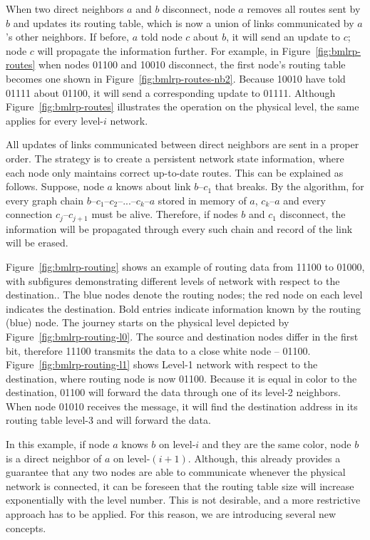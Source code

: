 \documentclass[14pt]{extarticle}
\theoremstyle{definition}
\begin{document}


When two direct neighbors $a$ and $b$ disconnect, node $a$ removes all routes sent by $b$ and updates its routing table, which is now a union of links communicated by $a$'s other neighbors. If before, $a$ told node $c$ about $b$, it will send an update to $c$; node $c$ will propagate the information further. For example, in Figure~\ref{fig:bmlrp-routes} when nodes 01100 and 10010 disconnect, the first node's routing table becomes one shown in Figure~\ref{fig:bmlrp-routes-nb2}. Because 10010 have told 01111 about 01100, it will send a corresponding update to 01111. Although Figure~\ref{fig:bmlrp-routes} illustrates the operation on the physical level, the same applies for every level-$i$ network.

All updates of links communicated between direct neighbors are sent in a proper order. The strategy is to create a persistent network state information, where each node only maintains correct up-to-date routes. This can be explained as follows. Suppose, node $a$ knows about link $b$--$c_1$ that breaks. By the algorithm, for every graph chain $b$--$c_1$--$c_2$--...--$c_k$--$a$ stored in memory of $a$, $c_k$--$a$ and every connection $c_j$--$c_{j+1}$ must be alive. Therefore, if nodes $b$ and $c_1$ disconnect, the information will be propagated through every such chain and record of the link will be erased.

Figure~\ref{fig:bmlrp-routing} shows an example of routing data from 11100 to 01000, with subfigures demonstrating different levels of network with respect to the destination.. The blue nodes denote the routing nodes; the red node on each level indicates the destination. Bold entries indicate information known by the routing (blue) node. The journey starts on the physical level depicted by Figure~\ref{fig:bmlrp-routing-l0}. The source and destination nodes differ in the first bit, therefore 11100 transmits the data to a close white node -- 01100. Figure~\ref{fig:bmlrp-routing-l1} shows Level-1 network with respect to the destination, where routing node is now 01100. Because it is equal in color to the destination, 01100 will forward the data through one of its level-2 neighbors. When node 01010 receives the message, it will find the destination address in its routing table level-3 and will forward the data.



In this example, if node $a$ knows $b$ on level-$i$ and they are the same color, node $b$ is a direct neighbor of $a$ on level-$(i+1)$. Although, this already provides a guarantee that any two nodes are able to communicate whenever the physical network is connected, it can be foreseen that the routing table size will increase exponentially with the level number. This is not desirable, and a more restrictive approach has to be applied. For this reason, we are introducing several new concepts.
\end{document}
